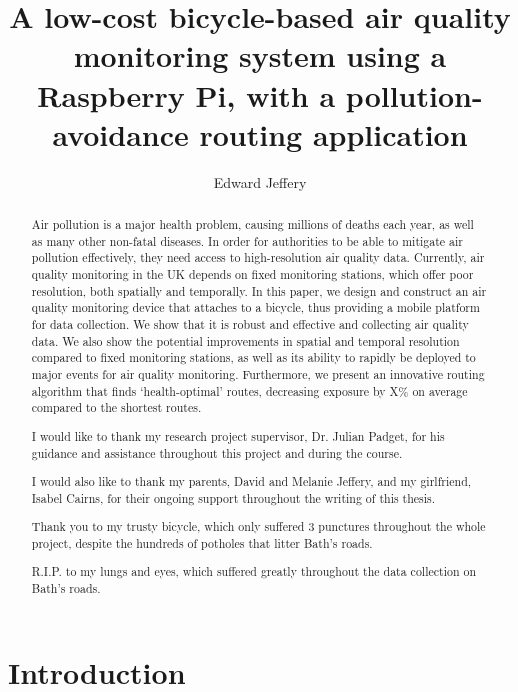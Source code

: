 \documentclass[11pt]{report}
\title{\vspace{-1cm}A low-cost bicycle-based air quality monitoring system using a Raspberry Pi, with a pollution-avoidance routing application}
\author{Edward Jeffery}
\renewcommand{\abstractname}{Abstract}
\begin{document}
\maketitle

\begin{abstract}
Air pollution is a major health problem, causing millions of deaths each year, as well as many other non-fatal diseases. In order for authorities to be able to mitigate air pollution effectively, they need access to high-resolution air quality data. Currently, air quality monitoring in the UK depends on fixed monitoring stations, which offer poor resolution, both spatially and temporally. In this paper, we design and construct an air quality monitoring device that attaches to a bicycle, thus providing a mobile platform for data collection. We show that it is robust and effective and collecting air quality data. We also show the potential improvements in spatial and temporal resolution compared to fixed monitoring stations, as well as its ability to rapidly be deployed to major events for air quality monitoring. Furthermore, we present an innovative routing algorithm that finds `health-optimal' routes, decreasing exposure by X\% on average compared to the shortest routes.
\end{abstract}

\renewcommand{\abstractname}{Acknowledgements}
\begin{abstract}
I would like to thank my research project supervisor, Dr. Julian Padget, for his guidance and assistance throughout this project and during the course. 
 
I would also like to thank my parents, David and Melanie Jeffery, and my girlfriend, Isabel Cairns, for their ongoing support throughout the writing of this thesis.

Thank you to my trusty bicycle, which only suffered 3 punctures throughout the whole project, despite the hundreds of potholes that litter Bath's roads.

R.I.P. to my lungs and eyes, which suffered greatly throughout the data collection on Bath's roads.
\end{abstract}

\setcounter{tocdepth}{1}
\tableofcontents
\listoffigures
\listoftables
\printnomenclature 


\chapter{Introduction}
\end{document}
